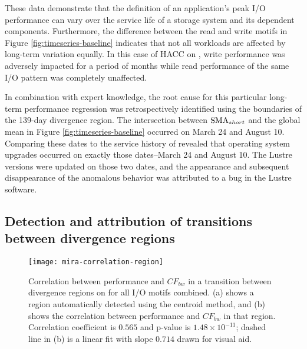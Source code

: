 These data demonstrate that the definition of an application's peak I/O performance can vary over the service life of a storage system and its dependent components.
Furthermore, the difference between the read and write motifs in Figure \ref{fig:timeseries-baseline} indicates that not all workloads are affected by long-term variation equally. 
In this case of HACC on \cori, write performance was adversely impacted for a period of months while read performance of the same I/O pattern was completely unaffected.

In combination with expert knowledge, the root cause for this particular long-term performance regression was retrospectively identified using the boundaries of the 139-day divergence region.
The intersection between $\textup{SMA}_{short}$ and the global mean in Figure \ref{fig:timeseries-baseline} occurred on March 24 and August 10.
Comparing these dates to the service history of \cori revealed that operating system upgrades occurred on exactly those dates--March 24 and August 10.
The Lustre versions were updated on those two dates, and the appearance and subsequent disappearance of the anomalous behavior was attributed to a bug in the Lustre software.







\subsection{Detection and attribution of transitions between divergence regions} \label{sec:results/transitions}

\begin{figure}
    \centering
    \texttt{[image: mira-correlation-region]}
    \vspace{-.35in}
    \caption{Correlation between performance and $CF_{bw}$ in a transition between divergence regions on \mira for all I/O motifs combined.
    (a) shows a region automatically detected using the centroid method, and (b) shows the correlation between performance and $CF_{bw}$ in that region.
    Correlation coefficient is $0.565$ and p-value is ${1.48 \times 10^{-11}}$; dashed line in (b) is a linear fit with slope $0.714$ drawn for visual aid.}
    \label{fig:mira-correlation-region}
\end{figure}

